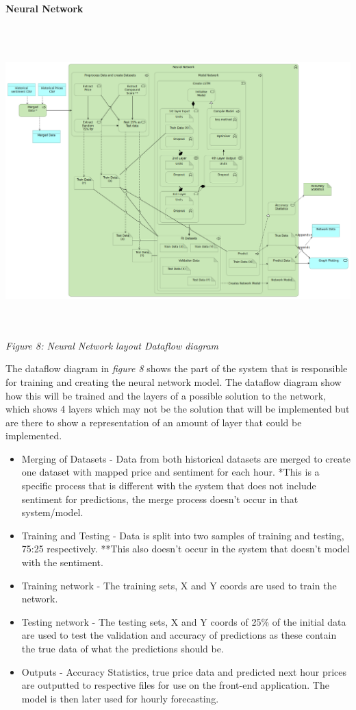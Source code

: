 \documentclass[oneside, 10pt]{article}
\begin{document}
		\textbf{Neural Network}
		\begin{center}
			\includegraphics[width=17cm,height=12cm]{images/Neural_Network.png}
			\textit{Figure 8: Neural Network layout Dataflow diagram}
		\end{center}
		The dataflow diagram in \textit{figure 8} shows the part of the system that is responsible for training and creating the neural network model. The dataflow diagram show how this will be trained and the layers of a possible solution to the network, which shows 4 layers which may not be the solution that will be implemented but are there to show a representation of an amount of layer that could be implemented.
		\begin{itemize}
			\item Merging of Datasets - Data from both historical datasets are merged to create one dataset with mapped price and sentiment for each hour. *This is a specific process that is different with the system that does not include sentiment for predictions, the merge process doesn't occur in that system/model.
			\item Training and Testing - Data is split into two samples of training and testing, 75:25 respectively. **This also doesn't occur in the system that doesn't model with the sentiment.
			\item Training network - The training sets, X and Y coords are used to train the network.
			\item Testing network - The testing sets, X and Y coords of 25\% of the initial data are used to test the validation and accuracy of predictions as these contain the true data of what the predictions should be.
			\item Outputs - Accuracy Statistics, true price data and predicted next hour prices are outputted to respective files for use on the front-end application. The model is then later used for hourly forecasting. 
		\end{itemize}
		
\end{document}
